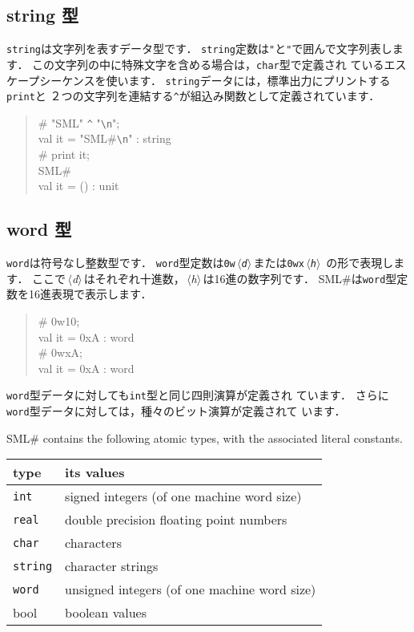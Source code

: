 \documentclass{jbook}
\newcommand{\smlsharp}{SML\#}
\newcommand{\nonterm}[1]{\mbox{$\,\langle$}{\it #1}\mbox{$\rangle\,$}}
\newenvironment{program}{\begin{quote}\begin{tt}}%
                        {\end{tt}\end{quote}}
\begin{document}
\subsection{string 型}
	{\tt string}は文字列を表すデータ型です．
	{\tt string}定数は{\tt "}と{\tt "}で囲んで文字列表します．
	この文字列の中に特殊文字を含める場合は，{\tt char}型で定義され
ているエスケープシーケンスを使います．
	{\tt string}データには，標準出力にプリントする{\tt print}と
２つの文字列を連結する{\tt \verb|^|}が組込み関数として定義されています．
\begin{program}
\# "SML" \verb|^| "\verb|\n|";\\
val it = "SML\#\verb|\n|" : string\\
\# print it;\\
SML\#\\
val it = () : unit
\end{program}

\subsection{word 型}
	{\tt word}は符号なし整数型です．
	{\tt word}型定数は{\tt 0w\nonterm{d}}または{\tt 0wx\nonterm{h}}
の形で表現します．
	ここで\nonterm{d}はそれぞれ十進数，\nonterm{h}は16進の数字列です．
	\smlsharp{}は{\tt word}型定数を16進表現で表示します．
\begin{program}
\# 0w10;\\
val it = 0xA : word\\
\# 0wxA;\\
val it = 0xA : word
\end{program}
	{\tt word}型データに対しても{\tt int}型と同じ四則演算が定義され
ています．
	さらに{\tt word}型データに対しては，種々のビット演算が定義されて
います．

\else%
	\smlsharp{} contains the following atomic types, with the
associated literal constants.

\begin{center}
\begin{tabular}{|l|l|}
\hline
type & its values
\\ \hline
{\tt int} & signed integers (of one machine word size)
\\ \hline
{\tt real} & double precision floating point numbers
\\ \hline
{\tt char} & characters
\\ \hline
{\tt string} & character strings
\\ \hline
{\tt word} & unsigned integers (of one machine word size)
\\ \hline
bool & boolean values
\\ \hline
\end{tabular}
\end{center}
\end{document}
